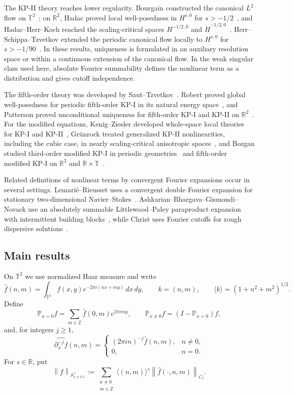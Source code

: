 \documentclass[12pt,reqno,letterpaper]{amsart}
\numberwithin{equation}{section}
\theoremstyle{definition}
\newcommand{\T}{\mathbb T}
\newcommand{\R}{\mathbb R}
\newcommand{\Z}{\mathbb Z}
\newcommand{\A}{\mathbb A}
\newcommand{\norm}[1]{\left\lVert #1\right\rVert}
\begin{document}
The KP-II theory reaches lower regularity.  Bourgain constructed the
canonical $L^2$ flow on $\T^2$~\cite{BourgainKP}; on $\R^2$, Hadac proved
local well-posedness in $H^{s,0}$ for $s>-1/2$~\cite{Hadac}, and
Hadac--Herr--Koch reached the scaling-critical spaces $H^{-1/2,0}$ and
$\dot H^{-1/2,0}$~\cite{HHK}.  Herr--Schippa--Tzvetkov extended the
periodic canonical flow locally to $H^{s,0}$ for $s>-1/90$~\cite{HST}.
In these results, uniqueness is formulated in an auxiliary resolution
space or within a continuous extension of the canonical flow.  In the weak
singular class used here, absolute Fourier summability defines the nonlinear
term as a distribution and gives cutoff independence.

The fifth-order theory was developed by Saut--Tzvetkov~\cite{SautTzvetkovFifth}.  Robert proved global well-posedness for periodic
fifth-order KP-I in its natural energy space~\cite{RobertFifth}, and
Patterson proved unconditional uniqueness for fifth-order KP-I and KP-II
on $\R^2$~\cite{Patterson5KP}.  For the modified
equations, Kenig--Ziesler developed whole-space local theories for KP-I and
KP-II~\cite{KenigZiesler}, Gr\"unrock treated generalized KP-II
nonlinearities, including the cubic case, in nearly scaling-critical anisotropic spaces~\cite{Gruenrock}, and Bozgan studied third-order modified KP-I in periodic
geometries~\cite{BozganPeriodic} and fifth-order modified KP-I on $\R^2$
and $\R\times\T$~\cite{BozganFifthModified}.

Related definitions of nonlinear terms by convergent Fourier expansions
occur in several settings.
Lemari\'e--Rieusset uses a convergent double Fourier expansion for stationary
two-dimensional Navier--Stokes~\cite{LemarieRieusset}.
Ashkarian--Bhargava--Gismondi--Novack use an absolutely summable
Littlewood--Paley paraproduct expansion with intermittent building blocks~\cite{ABGN}, while Christ uses Fourier cutoffs for rough dispersive
solutions~\cite{Christ}.

\subsection{Main results}

On $\T^2$ we use normalized Haar measure and write
\[
 \widehat f(n,m)=\int_{\T^2}f(x,y)e^{-2\pi i(nx+my)}\,dx\,dy,
 \qquad k=(n,m),\qquad \langle k\rangle=(1+n^2+m^2)^{1/2}.
\]
Define
\[
 \mathbb P_{x=0}f=\sum_{m\in\Z}\widehat f(0,m)e^{2\pi imy},
 \qquad \mathbb P_{x\neq0}f=(I-\mathbb P_{x=0})f,
\]
and, for integers $j\geq1$,
\begin{equation}\label{eq:inversex}
 \widehat{\partial_x^{-j}f}(n,m)
 =
 \begin{cases}
  (2\pi in)^{-j}\widehat f(n,m),&n\neq0,\\
  0,&n=0.
 \end{cases}
\end{equation}
For $s\in\R$, put
\begin{equation}\label{eq:timewiener}
 \norm{f}_{\A^s_{x\neq0,t}}
 :=\sum_{\substack{n\neq0\\m\in\Z}}
 \langle(n,m)\rangle^s
 \norm{\widehat f(\cdot,n,m)}_{C_t}.
\end{equation}
\end{document}
